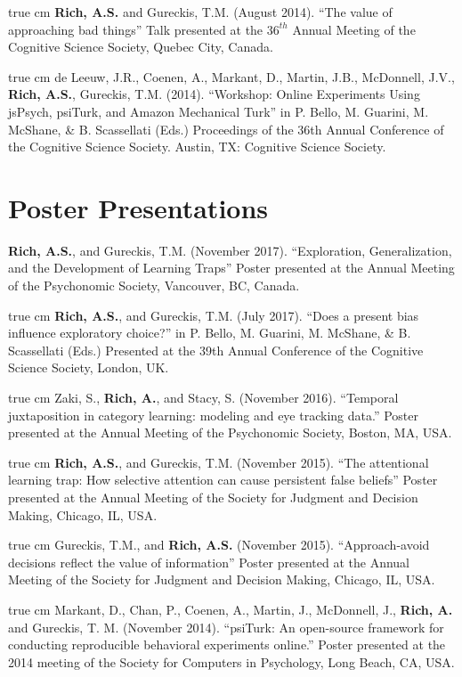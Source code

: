 \documentclass[12pt]{my_cv}
\def\ind{\hangindent=1 true cm\hangafter=1 \noindent}
\begin{document}
\ind \textbf{Rich, A.S.} and Gureckis, T.M. (August 2014). ``The value of
approaching bad things'' Talk presented at the $36^{th}$ Annual Meeting of the
Cognitive Science Society, Quebec City, Canada.

\ind de Leeuw, J.R., Coenen, A., Markant, D., Martin, J.B., McDonnell, J.V.,
\textbf{Rich, A.S.}, Gureckis, T.M. (2014). ``Workshop: Online Experiments Using
jsPsych, psiTurk, and Amazon Mechanical Turk'' in P. Bello, M. Guarini, M.
McShane, \& B. Scassellati (Eds.) Proceedings of the 36th Annual Conference of
the Cognitive Science Society. Austin, TX: Cognitive Science Society.

\section{Poster Presentations}

\textbf{Rich, A.S.}, and Gureckis, T.M. (November 2017).
``Exploration, Generalization, and the Development of Learning Traps''
Poster presented at the Annual Meeting of the Psychonomic Society, Vancouver, BC, Canada.

\ind \textbf{Rich, A.S.}, and Gureckis, T.M. (July 2017). ``Does a present bias
influence exploratory choice?'' in P. Bello, M. Guarini, M.
McShane, \& B. Scassellati (Eds.) Presented at the 39th Annual Conference of
the Cognitive Science Society, London, UK.

\ind Zaki, S., \textbf{Rich, A.}, and Stacy, S. (November 2016).
``Temporal juxtaposition in category learning: modeling and eye tracking data.''
Poster presented at the Annual Meeting of the Psychonomic Society, Boston, MA, USA.

\ind \textbf{Rich, A.S.}, and Gureckis, T.M. (November 2015). ``The attentional
learning trap: How selective attention can cause persistent false beliefs''
Poster presented at the Annual Meeting of the Society for Judgment and Decision
Making, Chicago, IL, USA.

\ind Gureckis, T.M., and \textbf{Rich, A.S.} (November 2015). ``Approach-avoid
decisions reflect the value of information'' Poster presented at the Annual
Meeting of the Society for Judgment and Decision Making, Chicago, IL, USA.

\ind Markant, D., Chan, P., Coenen, A., Martin, J., McDonnell, J., \textbf{Rich,
  A.} and Gureckis, T. M. (November 2014). ``psiTurk: An open-source framework
for conducting reproducible behavioral experiments online.'' Poster presented at
the 2014 meeting of the Society for Computers in Psychology, Long Beach, CA,
USA.
\end{document}
